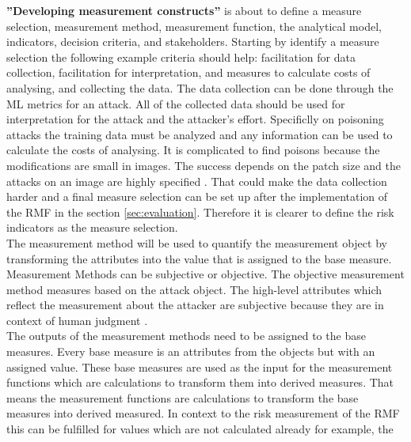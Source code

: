 \textbf{''Developing measurement constructs''} is about to define a measure selection, measurement method, measurement function, the analytical model, indicators, decision criteria, and stakeholders. Starting by identify a measure selection the following example criteria should help: facilitation for data collection, facilitation for interpretation, and measures to calculate costs of analysing, and collecting the data. The data collection can be done through the ML metrics for an attack. All of the collected data should be used for interpretation for the attack and the attacker's effort. Specificlly on poisoning attacks the training data must be analyzed and any information can be used to calculate the costs of analysing. It is complicated to find poisons because the modifications are small in images. The success depends on the patch size and the attacks on an image are highly specified \cite{DBLP:conf/icml/SchwarzschildGG21}. That could make the data collection harder and a final measure selection can be set up after the implementation of the RMF in the section \ref{sec:evaluation}. Therefore it is clearer to define the risk indicators as the measure selection. \\ The measurement method will be used to quantify the measurement object by transforming the attributes into the value that is assigned to the base measure. Measurement Methods can be subjective or objective. The objective measurement method measures based on the attack object. The high-level attributes which reflect the measurement about the attacker are subjective because they are in context of
human judgment \cite{DBLP:conf/crisis/DoynikovaNGK20}. \\ The outputs of the measurement methods need to be assigned to the base measures. Every base measure is an attributes from the objects but with
an assigned value. These base measures are used as the input for the measurement functions which are calculations to transform them into derived measures. That means the measurement functions are
calculations to transform the base measures into derived measured. In context to the risk measurement of the RMF this can be fulfilled for values which are not calculated already for example, the
